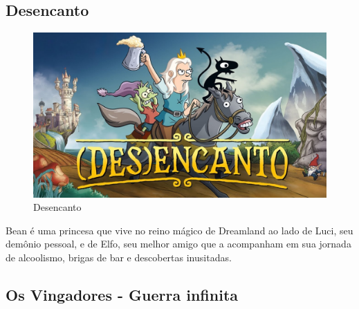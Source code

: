 \subsection{Desencanto}
\begin{figure}[htb]
	\caption{\label{Desencanto}Desencanto}
	\begin{center}
	    \includegraphics[width=\textwidth/2]{imagens/Desencanto.jpg}
	\end{center}
\end{figure}

Bean é uma princesa que vive no reino mágico de Dreamland ao lado de Luci, seu demônio pessoal, e de Elfo, seu melhor amigo que a acompanham em sua jornada de alcoolismo, brigas de bar e descobertas inusitadas.

\pagebreak

\subsection{Os Vingadores - Guerra infinita}


